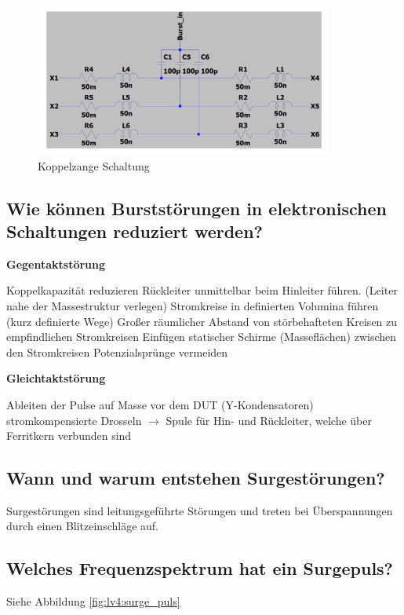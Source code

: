 \begin{figure}[ht]
  \centering
  \includegraphics[height=5cm]{src/assets/pictures/lv4_koppelzange.png}
  \caption{Koppelzange Schaltung}\label{fig:lv4:koppelzange}
\end{figure}

\subsection{Wie können Burststörungen in elektronischen Schaltungen reduziert werden?}
\textbf{Gegentaktstörung}
\begin{outline}
  \1 Koppelkapazität reduzieren
  \1 Rückleiter unmittelbar beim Hinleiter führen. (Leiter nahe der Massestruktur verlegen)
  \1 Stromkreise in definierten Volumina führen (kurz definierte Wege)
  \1 Großer räumlicher Abstand von störbehafteten Kreisen zu empfindlichen Stromkreisen
  \1 Einfügen statischer Schirme (Masseflächen) zwischen den Stromkreisen
  \1 Potenzialsprünge vermeiden
\end{outline}
%
\textbf{Gleichtaktstörung}
\begin{outline}
  \1 Ableiten der Pulse auf Masse vor dem DUT (Y-Kondensatoren)
  \1 stromkompensierte Drosseln \(\rightarrow\) Spule für Hin- und Rückleiter, welche über Ferritkern verbunden sind
\end{outline}

\subsection{Wann und warum entstehen Surgestörungen?}
Surgestörungen sind leitungsgeführte Störungen und treten bei Überspannungen durch einen Blitzeinschläge auf.

\subsection{Welches Frequenzspektrum hat ein Surgepuls?}
Siehe Abbildung \ref{fig:lv4:surge_puls}

